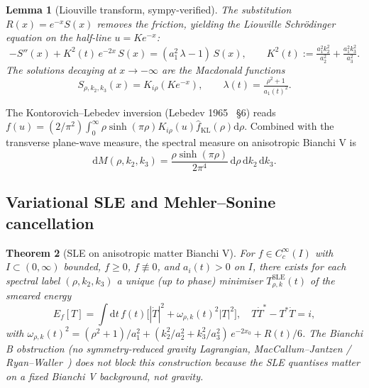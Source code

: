 \documentclass[11pt]{article}
\newtheorem{theorem}{Theorem}
\newtheorem{lemma}[theorem]{Lemma}
\theoremstyle{definition}
\begin{document}
\begin{lemma}[Liouville transform, sympy-verified]\label{lem:BVmode}
The substitution $R(x) = e^{-x}S(x)$ removes the friction, yielding the Liouville Schr\"odinger equation on the half-line $u = K e^{-x}$:
\begin{equation}\label{eq:BV-schro}
-S''(x) + K^2(t)\,e^{-2x}\,S(x) = (a_1^2\,\lambda - 1)\,S(x),\qquad K^2(t) := \tfrac{a_1^2 k_2^2}{a_2^2} + \tfrac{a_1^2 k_3^2}{a_3^2}.
\end{equation}
The solutions decaying at $x\to-\infty$ are the Macdonald functions
\begin{equation}\label{eq:Kirho}
S_{\rho,k_2,k_3}(x) = K_{i\rho}(K e^{-x}),\qquad \lambda(t) = \tfrac{\rho^2+1}{a_1(t)^2}.
\end{equation}
\end{lemma}

The Kontorovich--Lebedev inversion (Lebedev 1965~\cite{Lebedev1965} \S6) reads $f(u) = (2/\pi^2)\int_0^\infty\rho\sinh(\pi\rho)K_{i\rho}(u)\widehat f_{\mathrm{KL}}(\rho)\mathrm{d}\rho$. Combined with the transverse plane-wave measure, the spectral measure on anisotropic Bianchi V is
\begin{equation}\label{eq:BV-spectral}
\mathrm{d}M(\rho,k_2,k_3) = \frac{\rho\sinh(\pi\rho)}{2\pi^4}\,\mathrm{d}\rho\,\mathrm{d}k_2\,\mathrm{d}k_3.
\end{equation}

\subsection{Variational SLE and Mehler--Sonine cancellation}\label{sec:BV-Hadamard}

\begin{theorem}[SLE on anisotropic matter Bianchi V]\label{thm:SLE-BV}
For $f\in C_c^\infty(I)$ with $I\subset(0,\infty)$ bounded, $f\ge 0$, $f\not\equiv 0$, and $a_i(t)>0$ on $I$, there exists for each spectral label $(\rho,k_2,k_3)$ a unique (up to phase) minimiser $T^{\mathrm{SLE}}_{\rho,k}(t)$ of the smeared energy
\begin{equation*}
E_f[T] = \int\mathrm{d}t\,f(t)\bigl[|\dot T|^2 + \omega_{\rho,k}(t)^2|T|^2\bigr],\quad T\dot T^* - T^*\dot T = i,
\end{equation*}
with $\omega_{\rho,k}(t)^2 = (\rho^2+1)/a_1^2 + (k_2^2/a_2^2 + k_3^2/a_3^2)\,e^{-2x_0} + R(t)/6$. The Bianchi B obstruction (no symmetry-reduced gravity Lagrangian, MacCallum--Jantzen / Ryan--Waller~\cite{RyanWaller1997}) does \emph{not} block this construction because the SLE quantises matter on a fixed Bianchi V background, not gravity.
\end{theorem}
\end{document}
